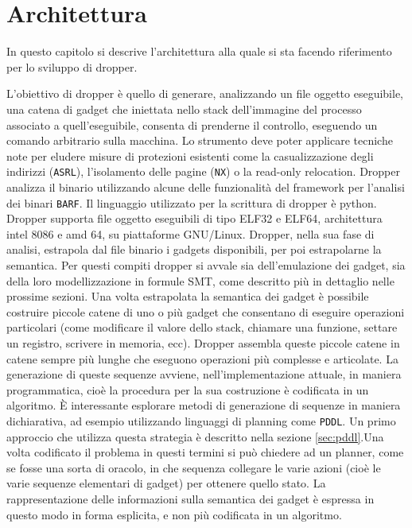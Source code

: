 \chapter{Architettura}
\label{cap:architettura}

In questo capitolo si descrive l'architettura alla quale si sta
facendo riferimento per lo sviluppo di dropper.

L'obiettivo di dropper è quello di generare, analizzando un file
oggetto eseguibile, una catena di gadget che iniettata nello stack
dell'immagine del processo associato a quell'eseguibile, consenta di
prenderne il controllo, eseguendo un comando arbitrario sulla
macchina. Lo strumento deve poter applicare tecniche note per eludere
misure di protezioni esistenti come la casualizzazione degli indirizzi
(\lstinline{ASRL}), l'isolamento delle pagine (\lstinline{NX}) o la
read-only relocation. Dropper analizza il binario utilizzando alcune
delle funzionalità del framework per l'analisi dei binari
\lstinline{BARF}. Il linguaggio utilizzato per la scrittura di dropper
è python. Dropper supporta file oggetto eseguibili di tipo ELF32 e
ELF64, architettura intel 8086 e amd 64, su piattaforme
GNU/Linux. Dropper, nella sua fase di analisi, estrapola dal file
binario i gadgets disponibili, per poi estrapolarne la semantica. Per
questi compiti dropper si avvale sia dell'emulazione dei gadget, sia
della loro modellizzazione in formule SMT, come descritto più in
dettaglio nelle prossime sezioni. Una volta estrapolata la semantica
dei gadget è possibile costruire piccole catene di uno o più gadget
che consentano di eseguire operazioni particolari (come modificare il
valore dello stack, chiamare una funzione, settare un registro,
scrivere in memoria, ecc). Dropper assembla queste piccole catene in
catene sempre più lunghe che eseguono operazioni più complesse e
articolate. La generazione di queste sequenze avviene,
nell'implementazione attuale, in maniera programmatica, cioè la
procedura per la sua costruzione è codificata in un algoritmo. È
interessante esplorare metodi di generazione di sequenze in maniera
dichiarativa, ad esempio utilizzando linguaggi di planning come
\lstinline{PDDL}\cite{pddl-97}. Un primo approccio che utilizza questa
strategia è descritto nella sezione \ref{sec:pddl}.Una volta
codificato il problema in questi termini si può chiedere ad un
planner, come se fosse una sorta di oracolo, in che sequenza collegare
le varie azioni (cioè le varie sequenze elementari di gadget) per
ottenere quello stato. La rappresentazione delle informazioni sulla
semantica dei gadget è espressa in questo modo in forma esplicita, e
non più codificata in un algoritmo.

